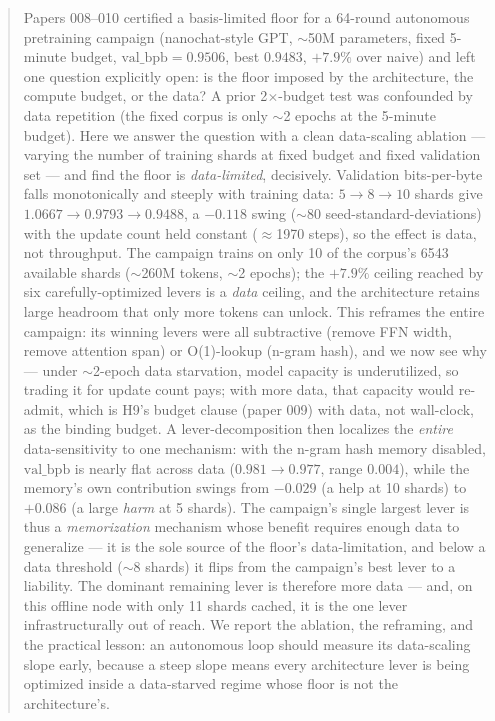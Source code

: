 \documentclass{article}
\newcommand{\valbpb}{\mathrm{val\_bpb}}
\begin{document}
\begin{abstract}
Papers 008--010 certified a basis-limited floor for a 64-round autonomous pretraining campaign (nanochat-style GPT, $\sim$50M parameters, fixed 5-minute budget, $\valbpb=0.9506$, best $0.9483$, $+7.9\%$ over naive) and left one question explicitly open: is the floor imposed by the architecture, the compute budget, or the data? A prior 2$\times$-budget test was confounded by data repetition (the fixed corpus is only $\sim$2 epochs at the 5-minute budget). Here we answer the question with a clean data-scaling ablation --- varying the number of training shards at fixed budget and fixed validation set --- and find the floor is \emph{data-limited}, decisively. Validation bits-per-byte falls monotonically and steeply with training data: $5\to8\to10$ shards give $1.0667\to0.9793\to0.9488$, a $-0.118$ swing ($\sim$80 seed-standard-deviations) with the update count held constant ($\approx$1970 steps), so the effect is data, not throughput. The campaign trains on only 10 of the corpus's 6543 available shards ($\sim$260M tokens, $\sim$2 epochs); the $+7.9\%$ ceiling reached by six carefully-optimized levers is a \emph{data} ceiling, and the architecture retains large headroom that only more tokens can unlock. This reframes the entire campaign: its winning levers were all subtractive (remove FFN width, remove attention span) or O(1)-lookup (n-gram hash), and we now see why --- under $\sim$2-epoch data starvation, model capacity is underutilized, so trading it for update count pays; with more data, that capacity would re-admit, which is H9's budget clause (paper 009) with data, not wall-clock, as the binding budget. A lever-decomposition then localizes the \emph{entire} data-sensitivity to one mechanism: with the n-gram hash memory disabled, $\valbpb$ is nearly flat across data ($0.981\to0.977$, range $0.004$), while the memory's own contribution swings from $-0.029$ (a help at 10 shards) to $+0.086$ (a large \emph{harm} at 5 shards). The campaign's single largest lever is thus a \emph{memorization} mechanism whose benefit requires enough data to generalize --- it is the sole source of the floor's data-limitation, and below a data threshold ($\sim$8 shards) it flips from the campaign's best lever to a liability. The dominant remaining lever is therefore more data --- and, on this offline node with only 11 shards cached, it is the one lever infrastructurally out of reach. We report the ablation, the reframing, and the practical lesson: an autonomous loop should measure its data-scaling slope early, because a steep slope means every architecture lever is being optimized inside a data-starved regime whose floor is not the architecture's.
\end{abstract}
\end{document}
